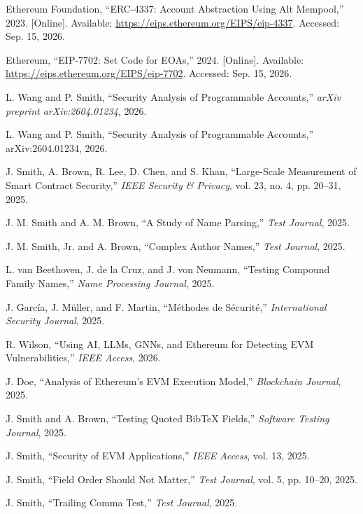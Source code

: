 Ethereum Foundation, ``{ERC-4337}: Account Abstraction Using Alt Mempool,'' 2023. [Online]. Available: \url{https://eips.ethereum.org/EIPS/eip-4337}. Accessed: Sep. 15, 2026.

Ethereum, ``{EIP-7702}: Set Code for {EOAs},'' 2024. [Online]. Available: \url{https://eips.ethereum.org/EIPS/eip-7702}. Accessed: Sep. 15, 2026.

L. Wang and P. Smith, ``Security Analysis of Programmable Accounts,'' \emph{arXiv preprint arXiv:2604.01234}, 2026.

L. Wang and P. Smith, ``Security Analysis of Programmable Accounts,'' arXiv:2604.01234, 2026.

J. Smith, A. Brown, R. Lee, D. Chen, and S. Khan, ``Large-Scale Measurement of Smart Contract Security,'' \emph{IEEE Security \& Privacy}, vol. 23, no. 4, pp. 20--31, 2025.

J. M. Smith and A. M. Brown, ``A Study of Name Parsing,'' \emph{Test Journal}, 2025.

J. M. Smith, Jr. and A. Brown, ``Complex Author Names,'' \emph{Test Journal}, 2025.

L. van Beethoven, J. de la Cruz, and J. von Neumann, ``Testing Compound Family Names,'' \emph{Name Processing Journal}, 2025.

J. Garc{\'i}a, J. M{\"u}ller, and F. Martin, ``M{\'e}thodes de S{\'e}curit{\'e},'' \emph{International Security Journal}, 2025.

R. Wilson, ``Using {AI}, {LLMs}, {GNNs}, and {Ethereum} for Detecting {EVM} Vulnerabilities,'' \emph{IEEE Access}, 2026.

J. Doe, ``Analysis of {{Ethereum}'s {EVM}} Execution Model,'' \emph{Blockchain Journal}, 2025.

J. Smith and A. Brown, ``Testing Quoted BibTeX Fields,'' \emph{Software Testing Journal}, 2025.

J. Smith, ``Security of {EVM} Applications,'' \emph{IEEE Access}, vol. 13, 2025.

J. Smith, ``Field Order Should Not Matter,'' \emph{Test Journal}, vol. 5, pp. 10--20, 2025.

J. Smith, ``Trailing Comma Test,'' \emph{Test Journal}, 2025.

